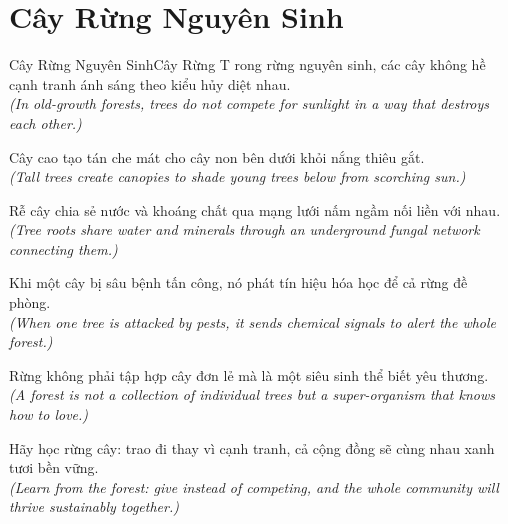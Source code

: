 \section{Cây Rừng Nguyên Sinh}
\begin{truyen}{Cây Rừng Nguyên Sinh}{Cây Rừng}
T rong rừng nguyên sinh, các cây không hề cạnh tranh ánh sáng theo kiểu hủy diệt nhau.\\
\textit{(In old-growth forests, trees do not compete for sunlight in a way that destroys each other.)}

Cây cao tạo tán che mát cho cây non bên dưới khỏi nắng thiêu gắt.\\
\textit{(Tall trees create canopies to shade young trees below from scorching sun.)}

Rễ cây chia sẻ nước và khoáng chất qua mạng lưới nấm ngầm nối liền với nhau.\\
\textit{(Tree roots share water and minerals through an underground fungal network connecting them.)}

Khi một cây bị sâu bệnh tấn công, nó phát tín hiệu hóa học để cả rừng đề phòng.\\
\textit{(When one tree is attacked by pests, it sends chemical signals to alert the whole forest.)}

Rừng không phải tập hợp cây đơn lẻ mà là một siêu sinh thể biết yêu thương.\\
\textit{(A forest is not a collection of individual trees but a super-organism that knows how to love.)}

\end{truyen}
\begin{baihoc}
  Hãy học rừng cây: trao đi thay vì cạnh tranh, cả cộng đồng sẽ cùng nhau xanh tươi bền vững.\\
  \textit{(Learn from the forest: give instead of competing, and the whole community will thrive sustainably together.)}
\end{baihoc}

